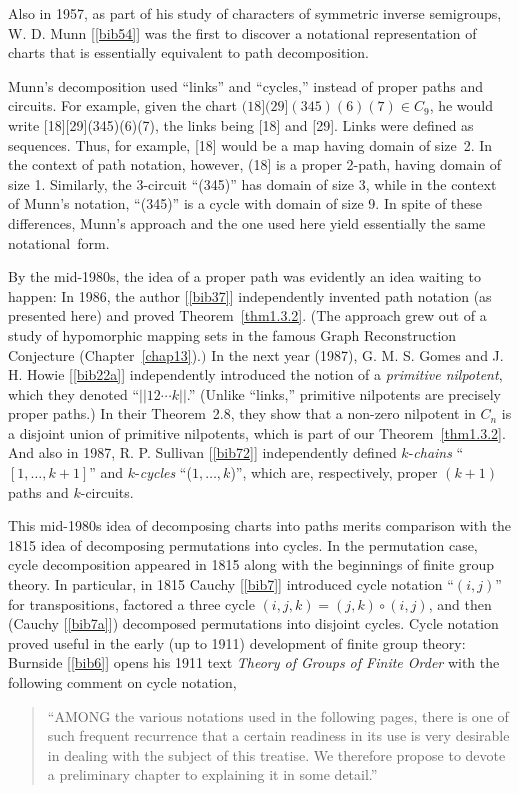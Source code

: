 \documentclass{surv-l}
\numberwithin{equation}{section}
\numberwithin{table}{section}
\numberwithin{figure}{section}
\theoremstyle{plain}
\theoremstyle{definition}
\begin{document}
Also in 1957, as part of his study of characters of symmetric
inverse semigroups, W. D. Munn
[\ref{bib54}] was the first to discover a
notational representation of charts that is essentially equivalent
to path decomposition.

Munn's decomposition used ``links'' and ``cycles,'' instead of
proper paths and circuits. For example, given the chart $(18](29](345)(6)(7) \in C_{9}$,
he would write [18][29](345)(6)(7), the
links being [18] and [29]. Links were defined as sequences. Thus,
for example, [18] would be a map having domain of size~2. In the
context of path notation, however, (18] is a proper 2-path, having
domain of size 1. Similarly, the 3-circuit ``(345)''  has domain
of size 3, while in the context of Munn's notation, ``(345)'' is a
cycle with domain of size 9. In spite of these differences, Munn's
approach and the one used here yield essentially the same
notational~form.

By the mid-1980s, the idea of a proper path was evidently an idea
waiting to happen: In 1986, the author
[\ref{bib37}] independently invented path
notation (as presented here) and proved Theorem~\ref{thm1.3.2}.
(The approach grew out of a study of hypomorphic mapping sets in
the famous Graph Reconstruction Conjecture
(Chapter~\ref{chap13}).$)$ In the next year (1987), G. M. S.
Gomes and J. H. Howie
[\ref{bib22a}] independently introduced the
notion of a \emph{primitive nilpotent}, which they denoted
``$||12\cdots k||$.'' (Unlike ``links,'' primitive nilpotents are
precisely proper paths.) In their Theorem~2.8, they show that a
non-zero nilpotent in $C_{n}$ is a disjoint union of primitive
nilpotents, which is part of our Theorem~\ref{thm1.3.2}. And also
in 1987, R. P. Sullivan
[\ref{bib72}] independently defined
$k$-\emph{chains} ``$[1,\ldots, k+1]$'' and $k$-\emph{cycles}
``($1,\ldots,k$)'', which are, respectively, proper $(k+1)$ paths
and $k$-circuits.

This mid-1980s idea of decomposing charts into paths merits
comparison with the 1815 idea of decomposing permutations into
cycles. In the permutation case, cycle decomposition appeared in
1815 along with the beginnings of finite group theory. In
particular, in 1815 Cauchy [\ref{bib7}]
introduced cycle notation ``$(i,j)$'' for transpositions, factored
a three cycle $(i,j,k)=(j,k)\circ (i,j)$, and then (Cauchy
[\ref{bib7a}]) decomposed permutations into
disjoint cycles. Cycle notation proved useful in the early (up to
1911) development of finite group theory: Burnside [\ref{bib6}] opens his 1911 text
\emph{Theory of Groups of Finite Order} with the following comment
on cycle notation,
\begin{quote}
``AMONG the various notations used in the following pages, there
is one of such frequent recurrence that a certain readiness in its
use is very desirable in dealing with the subject of this
treatise. We therefore propose to devote a preliminary chapter to
explaining it in some detail.''
\end{quote}
\end{document}
